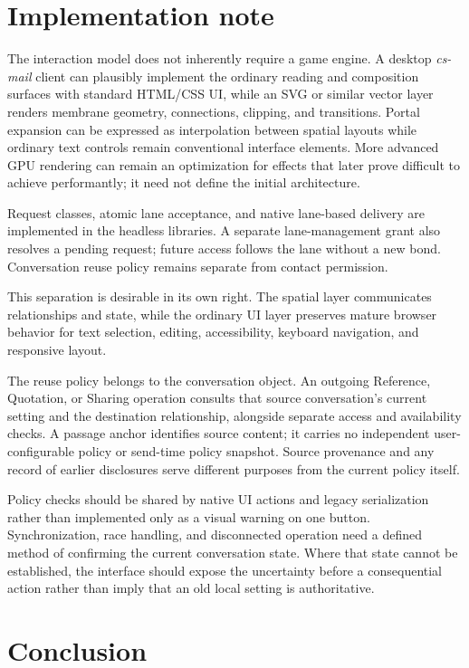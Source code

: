 \documentclass[11pt]{article}
\newcommand{\csmail}{\textit{cs-mail}}
\begin{document}
\section{Implementation note}

The interaction model does not inherently require a game engine. A desktop \csmail{} client can plausibly implement the ordinary reading and composition surfaces with standard HTML/CSS UI, while an SVG or similar vector layer renders membrane geometry, connections, clipping, and transitions. Portal expansion can be expressed as interpolation between spatial layouts while ordinary text controls remain conventional interface elements. More advanced GPU rendering can remain an optimization for effects that later prove difficult to achieve performantly; it need not define the initial architecture.

Request classes, atomic lane acceptance, and native lane-based delivery are implemented in the headless libraries. A separate lane-management grant also resolves a pending request; future access follows the lane without a new bond. Conversation reuse policy remains separate from contact permission.

This separation is desirable in its own right. The spatial layer communicates relationships and state, while the ordinary UI layer preserves mature browser behavior for text selection, editing, accessibility, keyboard navigation, and responsive layout.

The reuse policy belongs to the conversation object. An outgoing Reference, Quotation, or Sharing operation consults that source conversation's current setting and the destination relationship, alongside separate access and availability checks. A passage anchor identifies source content; it carries no independent user-configurable policy or send-time policy snapshot. Source provenance and any record of earlier disclosures serve different purposes from the current policy itself.

Policy checks should be shared by native UI actions and legacy serialization rather than implemented only as a visual warning on one button. Synchronization, race handling, and disconnected operation need a defined method of confirming the current conversation state. Where that state cannot be established, the interface should expose the uncertainty before a consequential action rather than imply that an old local setting is authoritative.

\section{Conclusion}
\end{document}
